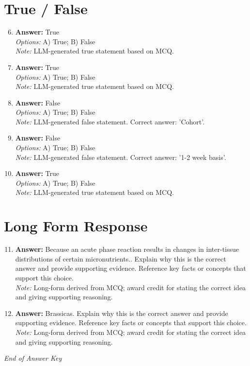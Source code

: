 \documentclass[12pt]{article}
\begin{document}
\section*{True / False}
\begin{enumerate}[label=\arabic*.]
\setcounter{enumi}{5}
\item \textbf{Answer:} True
\\ \textit{Options:} A) True; B) False
\\ \textit{Note:} LLM-generated true statement based on MCQ.
\item \textbf{Answer:} True
\\ \textit{Options:} A) True; B) False
\\ \textit{Note:} LLM-generated true statement based on MCQ.
\item \textbf{Answer:} False
\\ \textit{Options:} A) True; B) False
\\ \textit{Note:} LLM-generated false statement. Correct answer: 'Cohort'.
\item \textbf{Answer:} False
\\ \textit{Options:} A) True; B) False
\\ \textit{Note:} LLM-generated false statement. Correct answer: '1-2 week basis'.
\item \textbf{Answer:} True
\\ \textit{Options:} A) True; B) False
\\ \textit{Note:} LLM-generated true statement based on MCQ.
\end{enumerate}

\section*{Long Form Response}
\begin{enumerate}[label=\arabic*.]
\setcounter{enumi}{10}
\item \textbf{Answer:} Because an acute phase reaction results in changes in inter-tissue distributions of certain micronutrients.. Explain why this is the correct answer and provide supporting evidence. Reference key facts or concepts that support this choice.
\\ \textit{Note:} Long-form derived from MCQ; award credit for stating the correct idea and giving supporting reasoning.
\item \textbf{Answer:} Brassicas. Explain why this is the correct answer and provide supporting evidence. Reference key facts or concepts that support this choice.
\\ \textit{Note:} Long-form derived from MCQ; award credit for stating the correct idea and giving supporting reasoning.
\end{enumerate}

\vfill
\noindent\textit{End of Answer Key}
\end{document}
